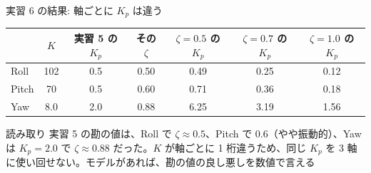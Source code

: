 \begin{frame}{実習 6 の結果: 軸ごとに $K_p$ は違う}
  \begin{table}
    \centering\footnotesize
    \begin{tabular}{lcccccc}
      \hline
      & $K$ & \textbf{実習 5 の $K_p$} & \textbf{その $\zeta$} & $\zeta=0.5$ の $K_p$ & $\zeta=0.7$ の $K_p$ & $\zeta=1.0$ の $K_p$ \\
      \hline
      Roll  & 102 & 0.5 & 0.50 & 0.49 & 0.25 & 0.12 \\
      Pitch &  70 & 0.5 & 0.60 & 0.71 & 0.36 & 0.18 \\
      Yaw   & 8.0 & 2.0 & 0.88 & 6.25 & 3.19 & 1.56 \\
      \hline
    \end{tabular}
  \end{table}

  \vspace{0.3em}

  \begin{exampleblock}{読み取り}\footnotesize
    実習 5 の勘の値は、Roll で $\zeta\approx0.5$、Pitch で $0.6$（やや振動的）、Yaw は $K_p=2.0$ で $\zeta\approx0.88$ だった。$K$ が軸ごとに 1 桁違うため、同じ $K_p$ を 3 軸に使い回せない。モデルがあれば、勘の値の良し悪しを数値で言える
  \end{exampleblock}
\end{frame}
